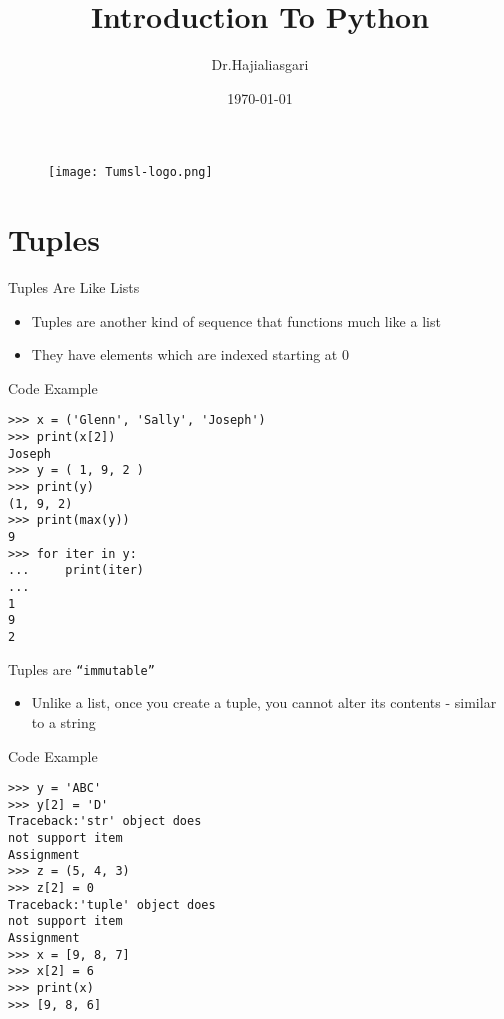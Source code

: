 \documentclass[serif, aspectratio=169]{beamer}
\author{Dr.Hajialiasgari}
\title{Introduction To Python}
\institute{
    Tehran University \\
    Of\\
    Medical Science
}
\date{\small \today}
\begin{document}
\begin{frame}
    \titlepage
    \vspace*{-0.6cm}
    \begin{figure}[htpb]
        \begin{center}
            \texttt{[image: Tumsl-logo.png]}
        \end{center}
    \end{figure}
\end{frame}

\begin{frame}    
\tableofcontents[sectionstyle=show, subsectionstyle=show/shaded/hide, subsubsectionstyle=show/shaded/hide]
\end{frame}

\section{Tuples}

\begin{frame}{Tuples Are Like Lists}
    \begin{itemize}
        \item Tuples are another kind of sequence that functions much like a list  \item They have elements which are indexed starting at 0
        
    \end{itemize}
\end{frame}

\begin{frame}[fragile]{Code Example}
    \begin{lstlisting}
>>> x = ('Glenn', 'Sally', 'Joseph')
>>> print(x[2])
Joseph
>>> y = ( 1, 9, 2 )
>>> print(y)
(1, 9, 2)
>>> print(max(y))
9
>>> for iter in y:
...     print(iter)
... 
1
9
2
   \end{lstlisting}
\end{frame}

\begin{frame}{Tuples are \texttt{\color{red}“immutable”}}
    \begin{itemize}
        \item Unlike a list, once you create a tuple, you cannot alter its contents - similar to a string   
    \end{itemize}
\end{frame}

\begin{frame}[fragile]{Code Example}
    \begin{lstlisting}
>>> y = 'ABC'
>>> y[2] = 'D'
Traceback:'str' object does 
not support item 
Assignment
>>> z = (5, 4, 3)
>>> z[2] = 0
Traceback:'tuple' object does 
not support item 
Assignment
>>> x = [9, 8, 7]
>>> x[2] = 6
>>> print(x)
>>> [9, 8, 6]
    \end{lstlisting}
\end{frame}
\end{document}

